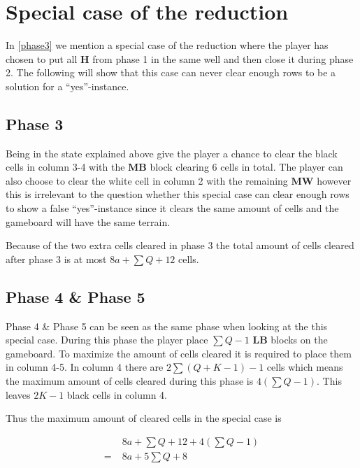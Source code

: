 \section{Special case of the reduction}
\label{specialcasereduction}

In \ref{phase3} we mention a special case of the reduction where the player has chosen to put all $\mathbf{H}$ from phase 1 in the same well and then close it during phase 2. The following will show that this case can never clear enough rows to be a solution for a ``yes''-instance.

\subsection{Phase 3}
Being in the state explained above give the player a chance to clear the black cells in column 3-4 with the $\mathbf{MB}$ block clearing 6 cells in total. The player can also choose to clear the white cell in column 2 with the remaining $\mathbf{MW}$ however this is irrelevant to the question whether this special case can clear enough rows to show a false ``yes''-instance since it clears the same amount of cells and the gameboard will have the same terrain.

Because of the two extra cells cleared in phase 3 the total amount of cells cleared after phase 3 is at most $8a + \sum Q + 12$ cells.

\subsection{Phase 4 \& Phase 5}

Phase 4 \& Phase 5 can be seen as the same phase when looking at the this special case. During this phase the player place $\sum Q - 1$ $\mathbf{LB}$ blocks on the gameboard. To maximize the amount of cells cleared it is required to place them in column 4-5. In column 4 there are $2 \sum \left( Q + K - 1 \right) - 1$ cells which means the maximum amount of cells cleared during this phase is $ 4 \left( \sum Q - 1 \right)$. This leaves $2K-1$ black cells in column 4.

Thus the maximum amount of cleared cells in the special case is

\begin{align*}
  & 8a + \sum Q + 12 + 4 \left( \sum Q - 1 \right) \\
= \; & 8a + 5 \sum Q + 8
\end{align*}
